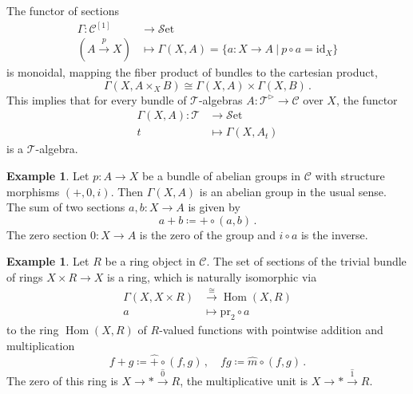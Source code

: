 \documentclass[12pt,reqno, a4paper]{amsart}
\numberwithin{equation}{section}
\theoremstyle{plain}
\theoremstyle{definition}
\newtheorem{Example}[Theorem]{Example}
\theoremstyle{remark}
\DeclareMathOperator{\Hom}{Hom}
\newcommand{\calC}{\mathcal{C}}
\newcommand{\calT}{\mathcal{T}}
\newcommand{\calTcone}{\mathcal{T}^\triangleright}
\newcommand{\id}{\mathrm{id}}
\newcommand{\pr}{\mathrm{pr}}
\newcommand{\Rmult}{\hat{m}}
\newcommand{\Radd}{\hat{+}}
\newcommand{\Runit}{\hat{1}}
\newcommand{\Rzero}{\hat{0}}
\newcommand{\Set}{{\mathcal{S}\mathrm{et}}}
\begin{document}
The functor of sections
\begin{equation}
\label{eq:SectionFunctor}
\begin{aligned}
  \Gamma: \calC^{[1]}
  &\longrightarrow \Set
  \\
  (A \xrightarrow{p} X)
  &\longmapsto
  \Gamma(X,A)
  = \{a:X \to A \ | \ p \circ a = \id_X \}
\end{aligned}
\end{equation}
is monoidal, mapping the fiber product of bundles to the cartesian product,
\begin{equation*}
  \Gamma(X, A \times_X B)
  \cong
  \Gamma(X,A) \times \Gamma(X,B)
  \,.
\end{equation*}
This implies that for every bundle of $\calT$-algebras $A: \calTcone \to \calC$ over $X$, the functor
\begin{align*}
  \Gamma(X,A): \calT &\longrightarrow \Set
  \\
  t &\longmapsto \Gamma(X, A_t)
\end{align*}
is a $\calT$-algebra.

\begin{Example}
Let $p: A \to X$ be a bundle of abelian groups in $\calC$ with structure morphisms $(+,0,i)$. Then $\Gamma(X,A)$ is an abelian group in the usual sense. The sum of two sections $a,b: X \to A$ is given by
\begin{equation*}
  a+b \coloneqq + \circ (a,b)
  \,.
\end{equation*}
The zero section $0: X \to A$ is the zero of the group and $i \circ a$ is the inverse.
\end{Example}

\begin{Example}
\label{ex:PointsOfR}
Let $R$ be a ring object in $\calC$. The set of sections of the trivial bundle of rings $X \times R \to X$ is a ring, which is naturally isomorphic via
\begin{equation}
\label{eq:SectionsTrivial}
\begin{aligned}
  \Gamma(X, X \times R) &\xrightarrow{~\cong~}
  \Hom(X, R) \\
  a &\longmapsto \pr_2 \circ a
\end{aligned}
\end{equation}
to the ring $\Hom(X,R)$ of $R$-valued functions with pointwise addition and multiplication
\begin{equation*}
  f + g \coloneqq \Radd \circ (f,g)
  \,,\quad
  fg \coloneqq \Rmult \circ (f,g)
  \,.
\end{equation*}
The zero of this ring is $X \to * \stackrel{\Rzero}{\to} R$, the multiplicative unit is $X \to * \stackrel{\Runit}{\to} R$.
\end{Example}
\end{document}

